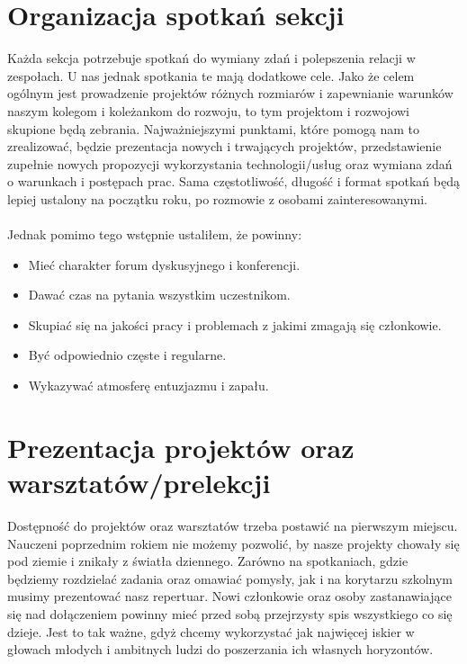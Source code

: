 \documentclass[9pt,a4paper]{report}
\begin{document}
\section{Organizacja spotkań sekcji} 

Każda sekcja potrzebuje spotkań do wymiany zdań i polepszenia relacji w zespołach. U nas jednak spotkania te mają dodatkowe cele. Jako że celem ogólnym jest prowadzenie projektów różnych rozmiarów i zapewnianie warunków naszym kolegom i koleżankom do rozwoju, to tym projektom i rozwojowi skupione będą zebrania. Najważniejszymi punktami, które pomogą nam to zrealizować, będzie prezentacja nowych i trwających projektów, przedstawienie zupełnie nowych propozycji wykorzystania technologii/usług oraz wymiana zdań o warunkach i postępach prac. Sama częstotliwość, długość i format spotkań będą lepiej ustalony na początku roku, po rozmowie z osobami zainteresowanymi.\\\\ 

Jednak pomimo tego wstępnie ustaliłem, że powinny: 

\begin{itemize} 
\item Mieć charakter forum dyskusyjnego i konferencji. 
\item Dawać czas na pytania wszystkim uczestnikom. 
\item Skupiać się na jakości pracy i problemach z jakimi zmagają się członkowie. 
\item Być odpowiednio częste i regularne. 
\item Wykazywać atmosferę entuzjazmu i zapału. 
\end{itemize} 

\section{Prezentacja projektów oraz warsztatów/prelekcji} 

Dostępność do projektów oraz warsztatów trzeba postawić na pierwszym miejscu. Nauczeni poprzednim rokiem nie możemy pozwolić, by nasze projekty chowały się pod ziemie i znikały z światła dziennego. Zarówno na spotkaniach, gdzie będziemy rozdzielać zadania oraz omawiać pomysły, jak i na korytarzu szkolnym musimy prezentować nasz repertuar. Nowi członkowie oraz osoby zastanawiające się nad dołączeniem powinny mieć przed sobą przejrzysty spis wszystkiego co się dzieje. Jest to tak ważne, gdyż chcemy wykorzystać jak najwięcej iskier w głowach młodych i ambitnych ludzi do poszerzania ich własnych horyzontów.\\ 
\end{document}
